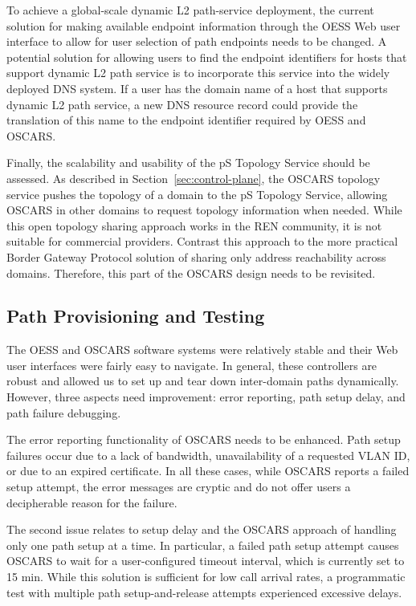 {To achieve a global-scale dynamic L2 path-service deployment,
the current solution for making available endpoint information
through the OESS Web user interface to allow for user selection of path endpoints
needs
to be changed. A potential solution for allowing users to find the
endpoint identifiers for hosts that support dynamic L2 path service is
to incorporate this service into the widely deployed DNS system. If a user
has the domain name of a host that supports dynamic L2 path service, a new DNS
resource record could provide the translation of this name to the endpoint
identifier required by OESS and OSCARS.

Finally, the scalability and usability of the pS Topology Service should be assessed.
As described in Section~\ref{sec:control-plane}, the OSCARS topology service
pushes the topology of a domain to the pS Topology Service, allowing OSCARS
in other domains to request topology information when needed. While this open
topology sharing approach works in the REN community, it is not suitable
for commercial providers. Contrast this approach to the more practical Border Gateway Protocol solution of sharing only address reachability across domains.
Therefore, this part of the OSCARS design needs to be revisited.


\subsection{Path Provisioning and Testing}
\label{sec:ckt-provisioning}

The OESS and OSCARS software systems were relatively stable and their Web user interfaces were fairly easy to navigate. In general, these controllers are
robust and allowed us to set up and tear down inter-domain paths dynamically.
However, three aspects need improvement: error reporting, path setup delay,
and path failure debugging.

The error reporting functionality of OSCARS needs to be enhanced. Path setup failures
occur due to a lack of bandwidth, unavailability of a requested VLAN ID, or due to an expired certificate. In all these cases, while OSCARS reports a failed setup attempt,
the error messages are cryptic and do not offer users a decipherable reason for the failure.

The second issue relates to setup delay and the OSCARS approach of handling only one path setup at a time.
In particular, a failed path setup attempt causes OSCARS to wait for a user-configured timeout interval, which is currently set to 15 min. While this solution is sufficient for low call arrival rates, a programmatic test with multiple path setup-and-release attempts experienced excessive delays.

}
